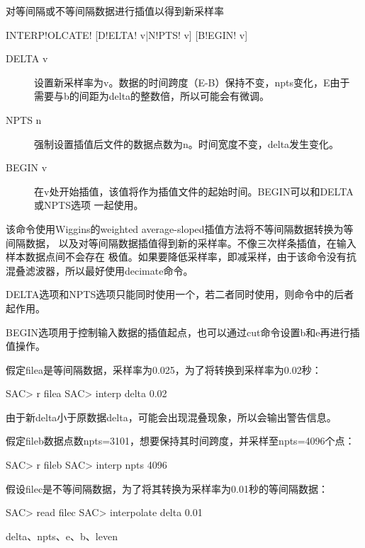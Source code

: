 \label{cmd:interpolate}

对等间隔或不等间隔数据进行插值以得到新采样率

\begin{SACSTX}
INTERP!OLCATE! [D!ELTA! v|N!PTS! v] [B!EGIN! v]
\end{SACSTX}

\begin{description}
\item [DELTA v] 设置新采样率为v。数据的时间跨度（E-B）保持不变，npts变化，E由于
    需要与b的间距为delta的整数倍，所以可能会有微调。
\item [NPTS n] 强制设置插值后文件的数据点数为n。时间宽度不变，delta发生变化。
\item [BEGIN v] 在v处开始插值，该值将作为插值文件的起始时间。BEGIN可以和DELTA或NPTS选项
    一起使用。
\end{description}

该命令使用Wiggins的weighted average-sloped插值方法将不等间隔数据转换为等间隔数据，
以及对等间隔数据插值得到新的采样率。不像三次样条插值，在输入样本数据点间不会存在
极值。如果要降低采样率，即减采样，由于该命令没有抗混叠滤波器，所以最好使用decimate命令。

DELTA选项和NPTS选项只能同时使用一个，若二者同时使用，则命令中的后者起作用。

BEGIN选项用于控制输入数据的插值起点，也可以通过cut命令设置b和e再进行插值操作。

假定filea是等间隔数据，采样率为0.025，为了将转换到采样率为0.02秒：
\begin{SACCode}
SAC> r filea
SAC> interp delta 0.02
\end{SACCode}
由于新delta小于原数据delta，可能会出现混叠现象，所以会输出警告信息。

假定fileb数据点数npts=3101，想要保持其时间跨度，并采样至npts=4096个点：
\begin{SACCode}
SAC> r fileb
SAC> interp npts 4096
\end{SACCode}

假设filec是不等间隔数据，为了将其转换为采样率为0.01秒的等间隔数据：
\begin{SACCode}
SAC> read filec
SAC> interpolate delta 0.01
\end{SACCode}

delta、npts、e、b、leven

